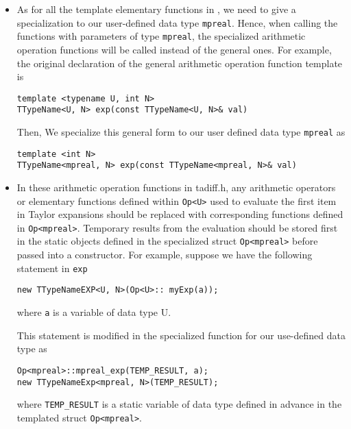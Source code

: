 \begin{enumerate}
	\begin{itemize}
		\item As for all the template elementary functions in \fadiff, we need to give a specialization to our user-defined data type {\tt mpreal}. Hence, when calling the functions with parameters of type {\tt mpreal}, the specialized arithmetic operation functions will be called instead of the general ones. For example, the original declaration of the general arithmetic operation function template is
\begin{lstlisting}[numbers=none]
template <typename U, int N>
TTypeName<U, N> exp(const TTypeName<U, N>& val)
\end{lstlisting}	
	Then, We specialize this general form to our user defined data type {\tt mpreal} as
\begin{lstlisting}[numbers=none]
template <int N>
TTypeName<mpreal, N> exp(const TTypeName<mpreal, N>& val)
\end{lstlisting}	
		\item In these arithmetic operation functions in tadiff.h, any arithmetic operators or elementary functions defined within \texttt{Op<U>} used to evaluate the first item in Taylor expansions should be replaced with corresponding functions defined in \texttt{Op<mpreal>}. Temporary results from the evaluation should be stored first in the static \mpreal objects defined in the specialized struct \texttt{Op<mpreal>} before passed into a constructor. For example, suppose we have the following statement in {\tt exp}
\begin{lstlisting}[numbers=none]
new TTypeNameEXP<U, N>(Op<U>:: myExp(a));
\end{lstlisting}			
		where \texttt{a} is a variable of data type U.
		
		This statement is modified in the specialized function for our use-defined data type \mpreal as
\begin{lstlisting}[numbers=none]
Op<mpreal>::mpreal_exp(TEMP_RESULT, a);
new TTypeNameExp<mpreal, N>(TEMP_RESULT);
\end{lstlisting}		
		where {\tt TEMP\_RESULT} is a static variable of data type \mpreal defined in advance in the templated struct {\tt Op<mpreal>}.
	\end{itemize}
\end{enumerate}